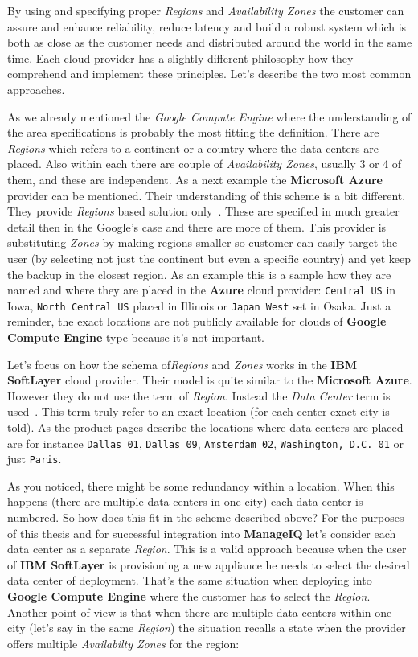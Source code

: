 By using and specifying proper \emph{Regions} and \emph{Availability Zones} the customer can assure and enhance reliability, reduce latency and build a robust system which is both as close as the customer needs and distributed around the world in the same time. Each cloud provider has a slightly different philosophy how they comprehend and implement these principles. Let's describe the two most common approaches.

As we already mentioned the \emph{Google Compute Engine} where the understanding of the area specifications is probably the most fitting the definition. There are \emph{Regions} which refers to a continent or a country where the data centers are placed. Also within each there are couple of \emph{Availability Zones}, usually 3 or 4 of them, and these are independent. As a next example the \textbf{Microsoft Azure} provider can be mentioned. Their understanding of this scheme is a bit different. They provide \emph{Regions} based solution only~\cite{azure}. These are specified in much greater detail then in the Google's case and there are more of them. This provider is substituting \emph{Zones} by making regions smaller so customer can easily target the user (by selecting not just the continent but even a specific country) and yet keep the backup in the closest region. As an example this is a sample how they are named and where they are placed in the \textbf{Azure} cloud provider: \texttt{Central US} in Iowa, \texttt{North Central US} placed in Illinois or \texttt{Japan West} set in Osaka. Just a reminder, the exact locations are not publicly available for clouds of \textbf{Google Compute Engine} type because it's not important.

Let's focus on how the schema of\emph{Regions} and \emph{Zones} works in the \textbf{IBM SoftLayer} cloud provider. Their model is quite similar to the \textbf{Microsoft Azure}. However they do not use the term of \emph{Region}. Instead the \emph{Data Center} term is used~\cite{softlayer_datacenters}. This term truly refer to an exact location (for each center exact city is told). As the product pages describe the locations where data centers are placed are for instance \texttt{Dallas 01}, \texttt{Dallas 09}, \texttt{Amsterdam 02}, \texttt{Washington, D.C. 01} or just \texttt{Paris}.

As you noticed, there might be some redundancy within a location. When this happens (there are multiple data centers in one city) each data center is numbered. So how does this fit in the scheme described above? For the purposes of this thesis and for successful integration into \textbf{ManageIQ} let's consider each data center as a separate \emph{Region}. This is a valid approach because when the user of \textbf{IBM SoftLayer} is provisioning a new appliance he needs to select the desired data center of deployment. That's the same situation when deploying into \textbf{Google Compute Engine} where the customer has to select the \emph{Region}. Another point of view is that when there are multiple data centers within one city (let's say in the same \emph{Region}) the situation recalls a state when the provider offers multiple \emph{Availabilty Zones} for the region:

